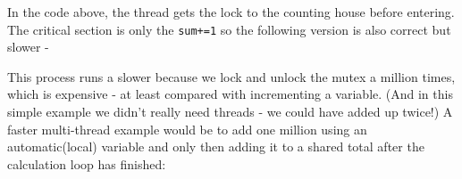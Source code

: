 \begin{Shaded}
\begin{Highlighting}[]


 \NormalTok{;}

  
     
    
    


     
    \NormalTok{;}
    \NormalTok{\}}
     
\NormalTok{\}}
\end{Highlighting}
\end{Shaded}

In the code above, the thread gets the lock to the counting house before
entering. The critical section is only the \texttt{sum+=1} so the
following version is also correct but slower -

\begin{Shaded}
\begin{Highlighting}[]
     
        \NormalTok{;}
    \NormalTok{\}}
     
\NormalTok{\}}
\end{Highlighting}
\end{Shaded}

This process runs a slower because we lock and unlock the mutex a
million times, which is expensive - at least compared with incrementing
a variable. (And in this simple example we didn't really need threads -
we could have added up twice!) A faster multi-thread example would be to
add one million using an automatic(local) variable and only then adding
it to a shared total after the calculation loop has finished:

